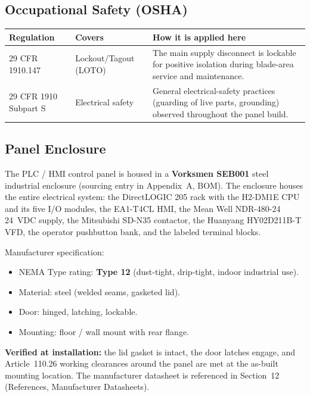 \documentclass[hidelinks,12pt]{article}
\begin{document}
\subsection{Occupational Safety (OSHA)}
\renewcommand{\arraystretch}{1.3}
\noindent\begin{tabularx}{\textwidth}{|p{2.5cm}|p{3.0cm}|X|}
\hline
\rowcolor{PSUgreen!12}\textbf{Regulation} & \textbf{Covers} & \textbf{How it is applied here} \\
\hline
29 CFR 1910.147 & Lockout/Tagout (LOTO) & The main supply disconnect is lockable for positive isolation during blade-area service and maintenance. \\ \hline
29 CFR 1910 Subpart S & Electrical safety & General electrical-safety practices (guarding of live parts, grounding) observed throughout the panel build. \\
\hline
\end{tabularx}
\renewcommand{\arraystretch}{1.0}

\subsection{Panel Enclosure}
\label{subsec:enclosure}

The PLC / HMI control panel is housed in a \textbf{Vorksmen SEB001} steel
industrial enclosure (sourcing entry in Appendix~A, BOM). The enclosure
houses the entire electrical system: the DirectLOGIC 205 rack with the
H2-DM1E CPU and its five I/O modules, the EA1-T4CL HMI, the
Mean Well NDR-480-24 24~VDC supply, the Mitsubishi SD-N35 contactor, the
Huanyang HY02D211B-T VFD, the operator pushbutton bank, and the labeled
terminal blocks.

Manufacturer specification:

\begin{itemize}\setlength{\itemsep}{1pt}
  \item NEMA Type rating: \textbf{Type 12} (dust-tight, drip-tight, indoor industrial use).
  \item Material: steel (welded seams, gasketed lid).
  \item Door: hinged, latching, lockable.
  \item Mounting: floor / wall mount with rear flange.
\end{itemize}

\textbf{Verified at installation:} the lid gasket is intact, the door
latches engage, and Article~110.26 working clearances around the panel
are met at the as-built mounting location. The manufacturer datasheet
is referenced in Section~12 (References, Manufacturer Datasheets).
\end{document}

